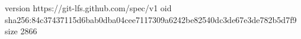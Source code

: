 version https://git-lfs.github.com/spec/v1
oid sha256:84c37437115d6bab0dba04cee7117309a6242be82540dc3de67e3de782b5d7f9
size 2866
